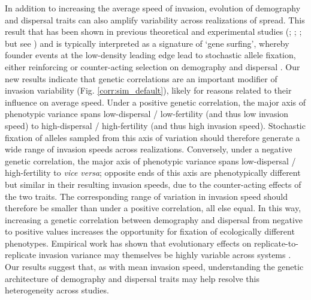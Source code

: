 \documentclass[11pt]{article}
\begin{document}
In addition to increasing the average speed of invasion, evolution of demography and dispersal traits can also amplify variability across realizations of spread.
This result that has been shown in previous theoretical and experimental studies (\citealt{ochocki_rapid_2017}; \citealt{weiss-lehman_rapid_2017}; \citealt{phillips_evolutionary_2015}; but see \citealt{williams_rapid_2016}) and is typically interpreted as a signature of `gene surfing', whereby founder events at the low-density leading edge lead to stochastic allele fixation, either reinforcing or counter-acting selection on demography and dispersal \citep{edmonds_mutations_2004,klopfstein_fate_2006,excoffier_surfing_2008,peischl_expansion_2015}.
Our new results indicate that genetic correlations are an important modifier of invasion variability (Fig. \ref{corr:sim_default}), likely for reasons related to their influence on average speed.
Under a positive genetic correlation, the major axis of phenotypic variance spans low-dispersal / low-fertility (and thus low invasion speed) to high-dispersal / high-fertility (and thus high invasion speed).
Stochastic fixation of alleles sampled from this axis of variation should therefore generate a wide range of invasion speeds across realizations.
Conversely, under a negative genetic correlation, the major axis of phenotypic variance spans low-dispersal / high-fertility to \textit{vice versa}; opposite ends of this axis are phenotypically different but similar in their resulting invasion speeds, due to the counter-acting effects of the two traits.
The corresponding range of variation in invasion speed should therefore be smaller than under a positive correlation, all else equal.
In this way, increasing a genetic correlation between demography and dispersal from negative to positive values increases the opportunity for fixation of ecologically different phenotypes.
Empirical work has shown that evolutionary effects on replicate-to-replicate invasion variance may themselves be highly variable across systems \citep{ochocki_rapid_2017,weiss-lehman_rapid_2017,williams_rapid_2016,van2018kin}.
Our results suggest that, as with mean invasion speed, understanding the genetic architecture of demography and dispersal traits may help resolve this heterogeneity across studies.
\end{document}

